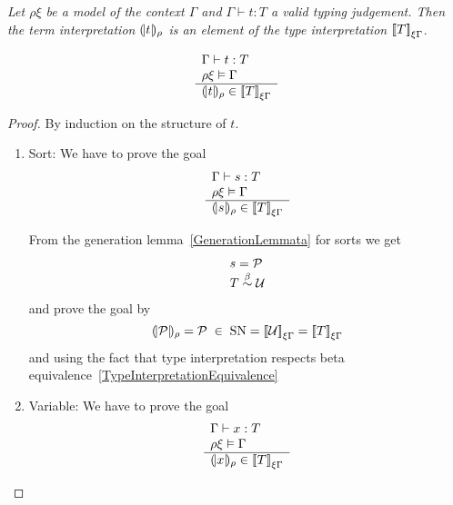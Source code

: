 \begin{theorem}
    \label{SoundnessTheorem}
    \emph{Let $\rho\xi$ be a model of the context $\Gamma$ and $\Gamma \vdash t
    : T$ a valid typing judgement. Then the term interpretation
    ${(\!|t|\!)_{\rho}}$ is an element of the type interpretation
    ${{{[\![} T {]\!]}}_{\xi\Gamma}}$}.

    \def\goala#1#2#3#4#5{
        \rulev{
            #1 \vdash #2 : #3
            \\
            #4 #5 \vDash #1
        }
        {
            \terminter{#2}{#4} \in \typeinter{#3}{#5#1}
        }
    }
    \def\goalb#1#2#3#4#5{
        \ruleall
        {#1 #3 #4 #5}
        {
            #1 \vdash #2 : #3
            \\
            #4 #5 \vDash #1
        }
        {
            \terminter{#2}{#4} \in \typeinter{#3}{#5#1}
        }
    }
    \def\goal#1#2#3#4#5{
        \forall #1 #2.
        \left[
        \ruleh{
            #1#2 \vDash #3
        }
        {
            \terminter{#4}{#1} \in \typeinter{#5}{#2#3}
        }
        \right]
    }

    $$
    \goala \Gamma t T \rho \xi
    $$
    \begin{proof}
        By induction on the structure of $t$.

        \begin{enumerate}
        \item Sort: We have to prove the goal
            $$
                \goala \Gamma s T \rho \xi
            $$

            From the generation lemma~\ref{GenerationLemmata} for sorts we
            get
            $$
            \begin{array}{l}
                s = {\cal P}
                \\
                T \stackrel{\beta}{\sim} {\cal U}
            \end{array}
            $$
            and prove the goal by
            $$
                {(\!|{\cal P}|\!)_{\rho}} = {\cal P}
                \;\in\;
                \text{SN} =
                {{{[\![} {\cal U} {]\!]}}_{\xi\Gamma}}
                =
                {{{[\![} T {]\!]}}_{\xi\Gamma}}
            $$
            and using the fact that type interpretation respects beta
                equivalence~\ref{TypeInterpretationEquivalence}

        \item Variable: We have to prove the goal
            $$
                \goala \Gamma x T \rho \xi
            $$


\end{enumerate}
\end{proof}
\end{theorem}
